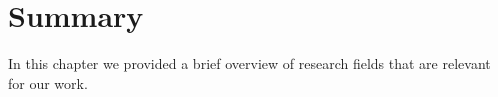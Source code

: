 


\section{Summary}\label{sec:state_of_the_art_summary}
In this chapter we provided a brief overview of research fields that are relevant for our work.








